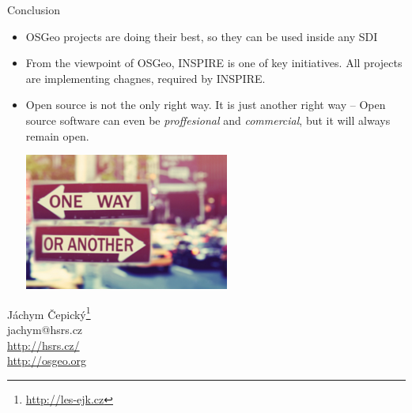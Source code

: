 \documentclass[xcolor=dvipsnames]{beamer}
\begin{document}
\begin{frame}{Conclusion}

  \begin{itemize}
  \item
    OSGeo projects are doing their best, so they can be used inside any SDI
    \pause
  \item
    From the viewpoint of OSGeo, INSPIRE is one of key initiatives. All projects
    are implementing chagnes, required by INSPIRE.
    \pause
  \item 
      Open source is not the only right way. It is just another right way --
      Open source software can even be {\em proffesional} and {\em commercial},
      but it will always remain \alert{open}.

\begin{center} 
    \includegraphics[height=4.5cm]{imgs/ils/oneway.png}
\end{center}
  
\end{itemize}
  
\end{frame}


\begin{frame}
    \begin{center}
        Jáchym Čepický\footnote{\url{http://les-ejk.cz}} \\
        jachym@hsrs.cz \\
        \url{http://hsrs.cz/} \\
        \url{http://osgeo.org}
    \end{center}
\end{frame}
\end{document}
